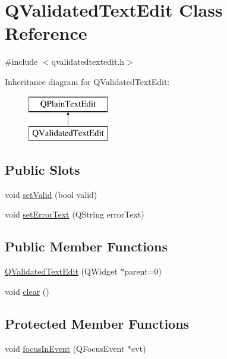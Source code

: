 \hypertarget{class_q_validated_text_edit}{}\section{Q\+Validated\+Text\+Edit Class Reference}
\label{class_q_validated_text_edit}


{\ttfamily \#include $<$qvalidatedtextedit.\+h$>$}

Inheritance diagram for Q\+Validated\+Text\+Edit\+:\begin{figure}[H]
\begin{center}
\leavevmode
\includegraphics[height=2.000000cm]{class_q_validated_text_edit}
\end{center}
\end{figure}
\subsection*{Public Slots}
\begin{DoxyCompactItemize}
\item 
void \hyperlink{class_q_validated_text_edit_ae7bbd8bc26efeb9f9900044391a68272}{set\+Valid} (bool valid)
\item 
void \hyperlink{class_q_validated_text_edit_a583500bc5a0c4c564cc920b724f8f78b}{set\+Error\+Text} (Q\+String error\+Text)
\end{DoxyCompactItemize}
\subsection*{Public Member Functions}
\begin{DoxyCompactItemize}
\item 
\hyperlink{class_q_validated_text_edit_a7266667905a9377fc0ab1741bede6071}{Q\+Validated\+Text\+Edit} (Q\+Widget $\ast$parent=0)
\item 
void \hyperlink{class_q_validated_text_edit_af2288206579ed0b08b9da6d7a9668fc9}{clear} ()
\end{DoxyCompactItemize}
\subsection*{Protected Member Functions}
\begin{DoxyCompactItemize}
\item 
void \hyperlink{class_q_validated_text_edit_a95d749d38769d2eb837af627f52a9872}{focus\+In\+Event} (Q\+Focus\+Event $\ast$evt)
\end{DoxyCompactItemize}


